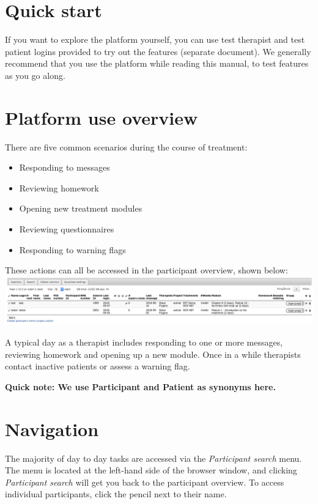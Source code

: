 \documentclass[]{book}
\providecommand{\tightlist}{%
  \setlength{\itemsep}{0pt}\setlength{\parskip}{0pt}}
\theoremstyle{definition}
\theoremstyle{definition}
\theoremstyle{definition}
\theoremstyle{remark}
\begin{document}
\hypertarget{quick-start}{%
\section{Quick start}\label{quick-start}}

If you want to explore the platform yourself, you can use test therapist
and test patient logins provided to try out the features (separate
document). We generally recommend that you use the platform while
reading this manual, to test features as you go along.

\hypertarget{platform-use-overview}{%
\section{Platform use overview}\label{platform-use-overview}}

There are five common scenarios during the course of treatment:

\begin{itemize}
\tightlist
\item
  Responding to messages
\item
  Reviewing homework
\item
  Opening new treatment modules
\item
  Reviewing questionnaires
\item
  Responding to warning flags
\end{itemize}

These actions can all be accessed in the participant overview, shown
below: \includegraphics{images/participant-overview.png}

A typical day as a therapist includes responding to one or more
messages, reviewing homework and opening up a new module. Once in a
while therapists contact inactive patients or assess a warning flag.

\textbf{Quick note: We use Participant and Patient as synonyms here.}

\hypertarget{navigation}{%
\section{Navigation}\label{navigation}}

The majority of day to day tasks are accessed via the \emph{Participant
search} menu. The menu is located at the left-hand side of the browser
window, and clicking \emph{Participant search} will get you back to the
participant overview. To access individual participants, click the
pencil next to their name.
\end{document}
